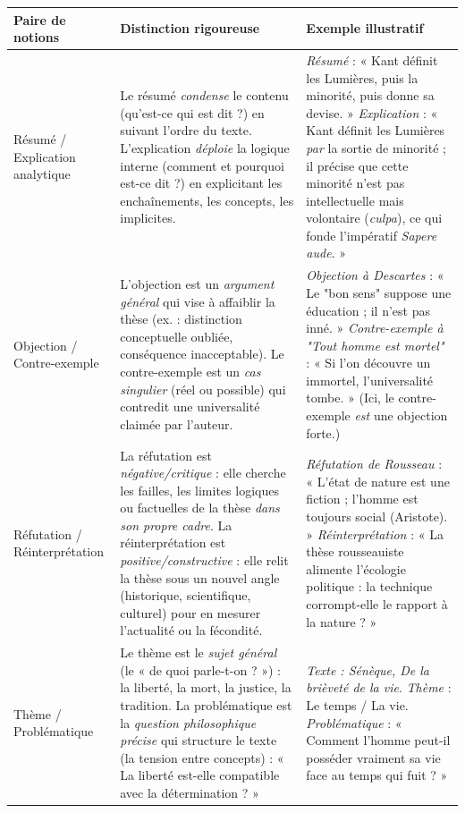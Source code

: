\documentclass[11pt]{article}
\newcommand{\cle}[1]{{\popxbold\color{popdark}#1}}
\begin{document}
\begin{corrige}
\begin{center}
\begin{tabularx}{\linewidth}{|l|X|X|}
\hline
\rowcolor{popblueL}
\textbf{Paire de notions} & \textbf{Distinction rigoureuse} & \textbf{Exemple illustratif} \\
\hline
\cle{Résumé} / \cle{Explication analytique} & Le résumé \emph{condense} le contenu (qu'est-ce qui est dit ?) en suivant l'ordre du texte. L'explication \emph{déploie} la logique interne (comment et pourquoi est-ce dit ?) en explicitant les enchaînements, les concepts, les implicites. & \emph{Résumé} : « Kant définit les Lumières, puis la minorité, puis donne sa devise. » \newline \emph{Explication} : « Kant définit les Lumières \emph{par} la sortie de minorité ; il précise que cette minorité n'est pas intellectuelle mais volontaire (\emph{culpa}), ce qui fonde l'impératif \emph{Sapere aude}. » \\
\hline
\cle{Objection} / \cle{Contre-exemple} & L'objection est un \emph{argument général} qui vise à affaiblir la thèse (ex. : distinction conceptuelle oubliée, conséquence inacceptable). Le contre-exemple est un \emph{cas singulier} (réel ou possible) qui contredit une universalité claimée par l'auteur. & \emph{Objection à Descartes} : « Le "bon sens" suppose une éducation ; il n'est pas inné. » \newline \emph{Contre-exemple à "Tout homme est mortel"} : « Si l'on découvre un immortel, l'universalité tombe. » (Ici, le contre-exemple \emph{est} une objection forte.) \\
\hline
\cle{Réfutation} / \cle{Réinterprétation} & La réfutation est \emph{négative/critique} : elle cherche les failles, les limites logiques ou factuelles de la thèse \emph{dans son propre cadre}. La réinterprétation est \emph{positive/constructive} : elle relit la thèse sous un nouvel angle (historique, scientifique, culturel) pour en mesurer l'actualité ou la fécondité. & \emph{Réfutation de Rousseau} : « L'état de nature est une fiction ; l'homme est toujours social (Aristote). » \newline \emph{Réinterprétation} : « La thèse rousseauiste alimente l'écologie politique : la technique corrompt-elle le rapport à la nature ? » \\
\hline
\cle{Thème} / \cle{Problématique} & Le thème est le \emph{sujet général} (le « de quoi parle-t-on ? ») : la liberté, la mort, la justice, la tradition. La problématique est la \emph{question philosophique précise} qui structure le texte (la tension entre concepts) : « La liberté est-elle compatible avec la détermination ? » & \emph{Texte : Sénèque, \emph{De la brièveté de la vie}}. \newline \emph{Thème} : Le temps / La vie. \newline \emph{Problématique} : « Comment l'homme peut-il posséder vraiment sa vie face au temps qui fuit ? » \\
\hline
\end{tabularx}
\end{center}
\end{corrige}
\end{document}
